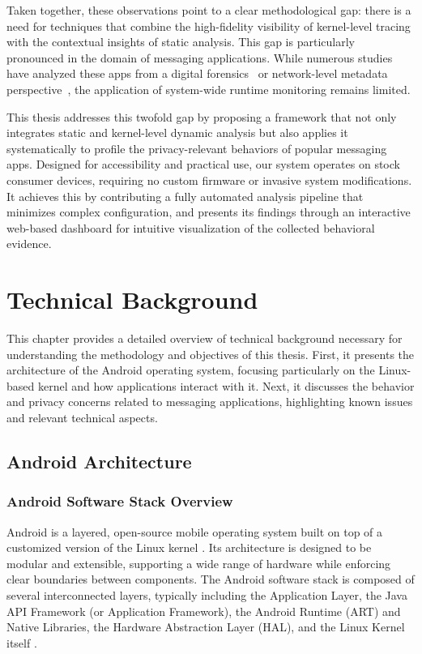 \documentclass[a4paper,12pt]{report}
\begin{document}
Taken together, these observations point to a clear methodological gap: there is a need for techniques that combine the high-fidelity visibility of kernel-level tracing with the contextual insights of static analysis. This gap is particularly pronounced in the domain of messaging applications. While numerous studies have analyzed these apps from a digital forensics~\cite{Onik2025SLR} or network-level metadata perspective~\cite{arxiv2020metadata}, the application of system-wide runtime monitoring remains limited.

This thesis addresses this twofold gap by proposing a framework that not only integrates static and kernel-level dynamic analysis but also applies it systematically to profile the privacy-relevant behaviors of popular messaging apps. Designed for accessibility and practical use, our system operates on stock consumer devices, requiring no custom firmware or invasive system modifications. It achieves this by contributing a fully automated analysis pipeline that minimizes complex configuration, and presents its findings through an interactive web-based dashboard for intuitive visualization of the collected behavioral evidence.
\chapter{Technical Background}

This chapter provides a detailed overview of technical background necessary for understanding the methodology and objectives of this thesis. First, it presents the architecture of the Android operating system, focusing particularly on the Linux-based kernel and how applications interact with it. Next, it discusses the behavior and privacy concerns related to messaging applications, highlighting known issues and relevant technical aspects.

\section{Android Architecture}

\subsection{Android Software Stack Overview}
Android is a layered, open-source mobile operating system built on top of a customized version of the Linux kernel \cite{AOSPArchOverview}. Its architecture is designed to be modular and extensible, supporting a wide range of hardware while enforcing clear boundaries between components. The Android software stack is composed of several interconnected layers, typically including the Application Layer, the Java API Framework (or Application Framework), the Android Runtime (ART) and Native Libraries, the Hardware Abstraction Layer (HAL), and the Linux Kernel itself \cite{tanenbaum2015modern}.
\end{document}
